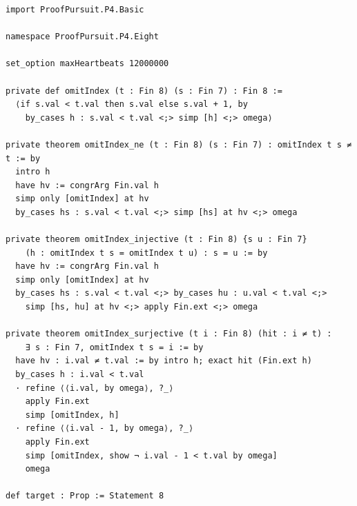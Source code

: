 \documentclass[11pt,a4paper]{article}
\begin{document}
\begin{Verbatim}[breaklines,breakanywhere,fontsize=\footnotesize]
import ProofPursuit.P4.Basic

namespace ProofPursuit.P4.Eight

set_option maxHeartbeats 12000000

private def omitIndex (t : Fin 8) (s : Fin 7) : Fin 8 :=
  ⟨if s.val < t.val then s.val else s.val + 1, by
    by_cases h : s.val < t.val <;> simp [h] <;> omega⟩

private theorem omitIndex_ne (t : Fin 8) (s : Fin 7) : omitIndex t s ≠ t := by
  intro h
  have hv := congrArg Fin.val h
  simp only [omitIndex] at hv
  by_cases hs : s.val < t.val <;> simp [hs] at hv <;> omega

private theorem omitIndex_injective (t : Fin 8) {s u : Fin 7}
    (h : omitIndex t s = omitIndex t u) : s = u := by
  have hv := congrArg Fin.val h
  simp only [omitIndex] at hv
  by_cases hs : s.val < t.val <;> by_cases hu : u.val < t.val <;>
    simp [hs, hu] at hv <;> apply Fin.ext <;> omega

private theorem omitIndex_surjective (t i : Fin 8) (hit : i ≠ t) :
    ∃ s : Fin 7, omitIndex t s = i := by
  have hv : i.val ≠ t.val := by intro h; exact hit (Fin.ext h)
  by_cases h : i.val < t.val
  · refine ⟨⟨i.val, by omega⟩, ?_⟩
    apply Fin.ext
    simp [omitIndex, h]
  · refine ⟨⟨i.val - 1, by omega⟩, ?_⟩
    apply Fin.ext
    simp [omitIndex, show ¬ i.val - 1 < t.val by omega]
    omega

def target : Prop := Statement 8


\end{Verbatim}
\end{document}
